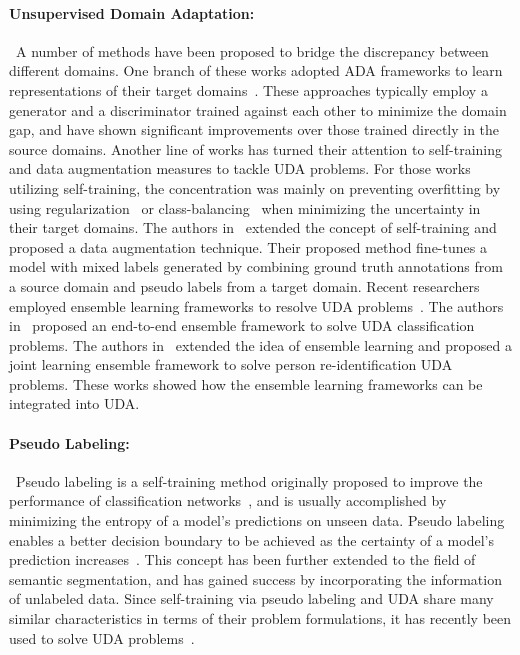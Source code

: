 \documentclass[final]{cvpr}
\begin{document}
\paragraph{Unsupervised Domain Adaptation:}~A number of methods have been proposed to bridge the discrepancy between different domains. One branch of these works adopted ADA frameworks to learn representations of their target domains~\cite{luo2019taking, hoffman2016fcns, hoffman2018cycada, luo2019significance, gong2019dlow, wu2018dcan, tsai2018learning, yang2020adversarial, tsai2019domain, vu2019advent, zhang2018fully, chen2017no, zheng2019unsupervised, chen2019crdoco, li2019bidirectional, du2019ssf}. These approaches typically employ a generator and a discriminator trained against each other to minimize the domain gap, and have shown significant improvements over those trained directly in the source domains. Another line of works has turned their attention to self-training and data augmentation measures to tackle UDA problems. For those works utilizing self-training, the concentration was mainly on preventing overfitting by using regularization~\cite{zou2019confidence, zheng2020rectifying} or class-balancing~\cite{zou2018unsupervised} when minimizing the uncertainty in their target domains. The authors in~\cite{tranheden2020dacs} extended the concept of self-training and proposed a data augmentation technique. Their proposed method fine-tunes a model with mixed labels generated by combining ground truth annotations from a source domain and pseudo labels from a target domain. Recent researchers employed ensemble learning frameworks to resolve UDA problems~\cite{nguyen2021unsupervised, kang2019contrastive}. The authors in~\cite{kang2019contrastive} proposed an end-to-end ensemble framework to solve UDA classification problems. The authors in~\cite{nguyen2021unsupervised} extended the idea of ensemble learning and proposed a joint learning ensemble framework to solve person re-identification UDA problems. These works showed how the ensemble learning frameworks can be integrated into UDA.

\paragraph{Pseudo Labeling:}~Pseudo labeling is a self-training method originally proposed to improve the performance of classification networks~\cite{lee2013pseudo}, and is usually accomplished by minimizing the entropy of a model's predictions on unseen data. Pseudo labeling enables a better decision boundary to be achieved as the certainty of a model's prediction increases~\cite{lee2013pseudo}. This concept has been further extended to the field of semantic segmentation, and has gained success by incorporating the information of unlabeled data. Since self-training via pseudo labeling and UDA share many similar characteristics in terms of their problem formulations, it has recently been used to solve UDA problems~\cite{zou2019confidence, zheng2020rectifying, tranheden2020dacs}.
\end{document}
